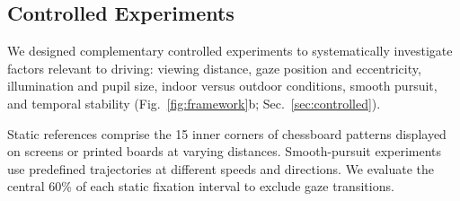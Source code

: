 
\subsection{Controlled Experiments}
\label{sec:method_controlled}

We designed complementary controlled experiments to systematically
investigate factors relevant to driving: viewing distance, gaze
position and eccentricity, illumination and pupil size, indoor
versus outdoor conditions, smooth pursuit, and temporal stability
(Fig.~\ref{fig:framework}b; Sec.~\ref{sec:controlled}).

Static references comprise the 15 inner corners of chessboard
patterns displayed on screens or printed boards at varying
distances. Smooth-pursuit experiments use predefined
trajectories at different speeds and directions. We evaluate
the central 60\% of each static fixation interval to exclude
gaze transitions.
